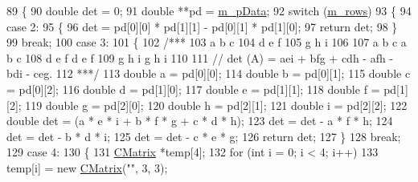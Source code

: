 \begin{DoxyCode}
89         \{
90             \textcolor{keywordtype}{double} det = 0;
91             \textcolor{keywordtype}{double} **pd = \hyperlink{classCMatrix_ab0f18d68cad9b6d750d05a96b60a759d}{m\_pData};
92             \textcolor{keywordflow}{switch} (\hyperlink{classCMatrix_ae23e5f8016ba06cfd1cce364a99f5037}{m\_rows})
93             \{
94                 \textcolor{keywordflow}{case} 2:
95                 \{
96                     det = pd[0][0] * pd[1][1] - pd[0][1] * pd[1][0];
97                     \textcolor{keywordflow}{return} det;
98                 \}
99                     \textcolor{keywordflow}{break};
100                 \textcolor{keywordflow}{case} 3:
101                 \{
102                     \textcolor{comment}{/***}
103 \textcolor{comment}{                     a b c}
104 \textcolor{comment}{                     d e f}
105 \textcolor{comment}{                     g h i}
106 \textcolor{comment}{ }
107 \textcolor{comment}{                     a b c a b c}
108 \textcolor{comment}{                     d e f d e f}
109 \textcolor{comment}{                     g h i g h i}
110 \textcolor{comment}{ }
111 \textcolor{comment}{                     // det (A) = aei + bfg + cdh - afh - bdi - ceg.}
112 \textcolor{comment}{                     ***/}
113                     \textcolor{keywordtype}{double} a = pd[0][0];
114                     \textcolor{keywordtype}{double} b = pd[0][1];
115                     \textcolor{keywordtype}{double} c = pd[0][2];
116                     \textcolor{keywordtype}{double} d = pd[1][0];
117                     \textcolor{keywordtype}{double} e = pd[1][1];
118                     \textcolor{keywordtype}{double} f = pd[1][2];
119                     \textcolor{keywordtype}{double} g = pd[2][0];
120                     \textcolor{keywordtype}{double} h = pd[2][1];
121                     \textcolor{keywordtype}{double} i = pd[2][2];
122                     \textcolor{keywordtype}{double} det = (a * e * i + b * f * g + c * d * h);
123                     det = det - a * f * h;
124                     det = det - b * d * i;
125                     det = det - c * e * g;
126                     \textcolor{keywordflow}{return} det;
127                 \}
128                     \textcolor{keywordflow}{break};
129                 \textcolor{keywordflow}{case} 4:
130                 \{
131                     \hyperlink{classCMatrix}{CMatrix} *temp[4];
132                     \textcolor{keywordflow}{for} (\textcolor{keywordtype}{int} i = 0; i < 4; i++)
133                         temp[i] = \textcolor{keyword}{new} \hyperlink{classCMatrix_a720aa6a48296f4414ac7f9021bc420c4}{CMatrix}(\textcolor{stringliteral}{""}, 3, 3);

\end{DoxyCode}
